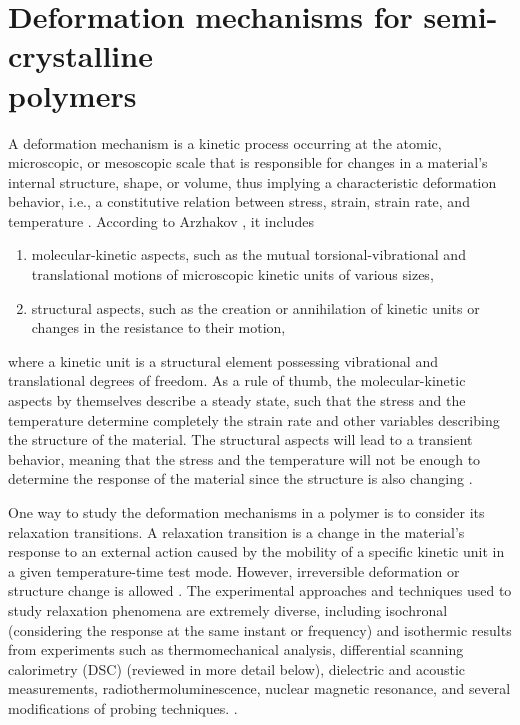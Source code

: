 \section{Deformation mechanisms for semi-crystalline\\ polymers}
A deformation mechanism is a kinetic process occurring at the atomic, microscopic, or mesoscopic scale that is responsible for changes in a material's internal structure, shape, or volume, thus implying a characteristic deformation behavior, i.e., a constitutive relation between stress, strain, strain rate, and temperature \citep{frostDeformationmechanismMapsPlasticity1982}.
According to Arzhakov \citep{arzhakovRelaxationPhysicalMechanical2019}, it includes
\begin{enumerate}
    \item molecular-kinetic aspects, such as the mutual torsional-vibrational and translational motions of microscopic kinetic units of various sizes,
    \item structural aspects, such as the creation or annihilation of kinetic units or changes in the resistance to their motion,
\end{enumerate}
where a kinetic unit is a structural element possessing vibrational and translational degrees of freedom.
As a rule of thumb, the molecular-kinetic aspects by themselves describe a steady state, such that the stress and the temperature determine completely the strain rate and other variables describing the structure of the material.
The structural aspects will lead to a transient behavior, meaning that the stress and the temperature will not be enough to determine the response of the material since the structure is also changing \citep{frostDeformationmechanismMapsPlasticity1982}.

One way to study the deformation mechanisms in a polymer is to consider its relaxation transitions.
A relaxation transition is a change in the material's response to an external action caused by the mobility of a specific kinetic unit in a given temperature-time test mode.
However, irreversible deformation or structure change is allowed \citep{arzhakovRelaxationPhysicalMechanical2019}.
The experimental approaches and techniques used to study relaxation phenomena are extremely diverse, including isochronal (considering the response at the same instant or frequency) and isothermic results from experiments such as thermomechanical analysis, differential scanning calorimetry (DSC) (reviewed in more detail below), dielectric and acoustic measurements, radiothermoluminescence, nuclear magnetic resonance, and several modifications of probing techniques. \citep{ferryViscoelasticPropertiesPolymers1980, arzhakovRelaxationPhysicalMechanical2019}.

